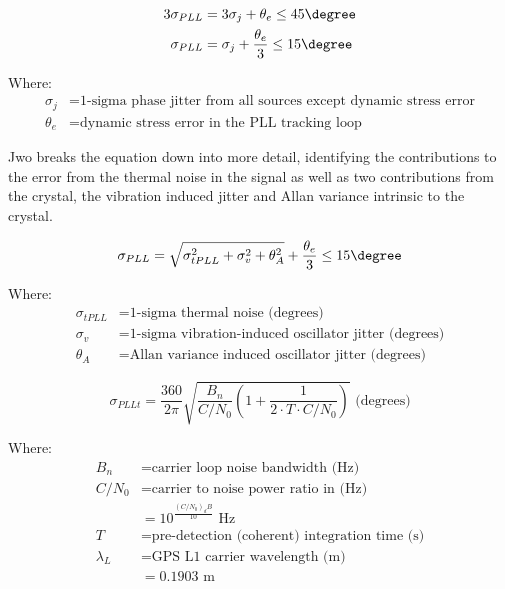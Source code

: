 \begin{align}
3 \sigma_{PLL} &= 3 \sigma_j +\theta_e \leq 45 \degree\\
\sigma_{PLL} &=\sigma_j + \frac{\theta_e}{3} \leq 15 \degree
\label{eq:WardJitter}
\end{align}

Where:
\begin{align*}
\sigma_j &= \text{1-sigma phase jitter from all sources except dynamic stress error} \\
\theta_e &= \text{dynamic stress error in the PLL tracking loop}
\end{align*}

Jwo breaks the equation down into more detail\cite{Jwo}, identifying the contributions to the error from the thermal noise in the signal as well as two contributions from the crystal, the vibration induced jitter and Allan variance intrinsic to the crystal.


\begin{equation}
\sigma_{PLL} = \sqrt{\sigma^2_{tPLL} + \sigma^2_v+ \theta^2_A} + \frac{\theta_e}{3} \leq 15 \degree 
\label{eq:JwoJitter}
\end{equation}

Where:
\begin{align*}
\sigma_{tPLL} &= \text{1-sigma thermal noise (degrees)}\\
\sigma_v &= \text{1-sigma vibration-induced oscillator jitter (degrees)}\\
\theta_A &= \text{Allan variance induced oscillator jitter (degrees)}
\end{align*}


\begin{equation}
\sigma_{PLLt} = \frac{360}{2 \pi} \sqrt{\frac{B_n}{C/N_0}(1+\frac{1}{2 \cdot T \cdot C/N_0})} \text{ (degrees)}
\label{eq:ThermalJitter}
\end{equation}

Where:
\begin{align*}
B_n &= \text{carrier loop noise bandwidth (Hz)} \\
C/N_0 &= \text{carrier to noise power ratio in (Hz)} \\
&=10^\frac{(C/N_0)_dB}{10} \text{ Hz}\\
T &= \text{pre-detection (coherent) integration time (s)} \\
\lambda_L &= \text{GPS L1 carrier wavelength (m)}\\
&= 0.1903 \text{ m}
\end{align*}



